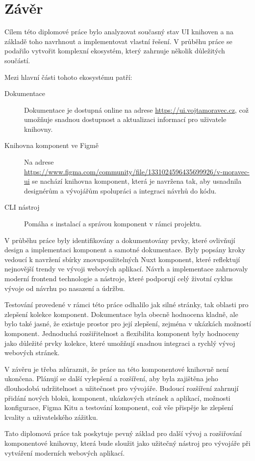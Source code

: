 
\chapter{Závěr}

Cílem této diplomové práce bylo analyzovat současný stav UI knihoven a na základě toho navrhnout a implementovat vlastní řešení. V průběhu práce se podařilo vytvořit komplexní ekosystém, který zahrnuje několik důležitých součástí.

Mezi hlavní části tohoto ekosystému patří:

\begin{description}
  \item[Dokumentace] Dokumentace je dostupná online na adrese \url{https://ui.vojtamoravec.cz}, což umožňuje snadnou dostupnost a aktualizaci informací pro uživatele knihovny.
  \item[Knihovna komponent ve Figmě] Na adrese \url{https://www.figma.com/community/file/1331024596435699926/v-moravec-ui} se nachází knihovna komponent, která je navržena tak, aby usnadnila designérům a vývojářům spolupráci a integraci návrhů do kódu.
  \item[CLI nástroj] Pomáha s instalací a správou komponent v rámci projektu.
\end{description}

V průběhu práce byly identifikovány a dokumentovány prvky, které ovlivňují design a implementaci komponent a samotné dokumentace. Byly popsány kroky vedoucí k navržení sbírky znovupoužitelných Nuxt komponent, které reflektují nejnovější trendy ve vývoji webových aplikací. Návrh a implementace zahrnovaly moderní frontend technologie a nástroje, které podporují celý životní cyklus vývoje od návrhu po nasazení a údržbu.

Testování provedené v rámci této práce odhalilo jak silné stránky, tak oblasti pro zlepšení kolekce komponent. Dokumentace byla obecně hodnocena kladně, ale bylo také jasné, že existuje prostor pro její zlepšení, zejména v ukázkách možností komponent. Jednoduchá rozšiřitelnost a flexibilita komponent byly hodnoceny jako důležité prvky kolekce, které umožňují snadnou integraci a rychlý vývoj webových stránek.

V závěru je třeba zdůraznit, že práce na této komponentové knihovně není ukončena. Plánují se další vylepšení a rozšíření, aby byla zajištěna jeho dlouhodobá udržitelnost a užitečnost pro vývojáře. Budoucí rozšíření zahrnují přidání nových bloků, komponent, ukázkových stránek a aplikací, možnosti konfigurace, Figma Kitu a testování komponent, což vše přispěje ke zlepšení kvality a uživatelského zážitku.

Tato diplomová práce tak poskytuje pevný základ pro další vývoj a rozšiřování komponentové knihovny, která bude sloužit jako užitečný nástroj pro vývojáře při vytváření moderních webových aplikací.
